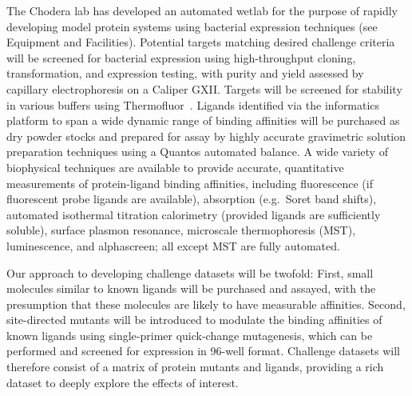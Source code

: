 \documentclass[11pt]{article}
\begin{document}
The Chodera lab has developed an automated wetlab for the purpose of rapidly developing model protein systems using bacterial expression techniques (see Equipment and Facilities).
Potential targets matching desired challenge criteria will be screened for bacterial expression using high-throughput cloning, transformation, and expression testing, with purity and yield assessed by capillary electrophoresis on a Caliper GXII.
Targets will be screened for stability in various buffers using Thermofluor~\cite{Reinhard:2013:ActaCrystallographicaSectionFStructuralBiologyandCrystallizationCommunications}.
Ligands identified via the informatics platform to span a wide dynamic range of binding affinities will be purchased as dry powder stocks and prepared for assay by highly accurate gravimetric solution preparation techniques using a Quantos automated balance.
A wide variety of biophysical techniques are available to provide accurate, quantitative measurements of protein-ligand binding affinities, including fluorescence (if fluorescent probe ligands are available), absorption (e.g.~Soret band shifts), automated isothermal titration calorimetry (provided ligands are sufficiently soluble), surface plasmon resonance, microscale thermophoresis (MST), luminescence, and alphascreen; all except MST are fully automated.

Our approach to developing challenge datasets will be twofold:
First, small molecules similar to known ligands will be purchased and assayed, with the presumption that these molecules are likely to have measurable affinities.
Second, site-directed mutants will be introduced to modulate the binding affinities of known ligands using single-primer quick-change mutagenesis, which can be performed and screened for expression in 96-well format.
Challenge datasets will therefore consist of a matrix of protein mutants and ligands, providing a rich dataset to deeply explore the effects of interest.

\end{document}
